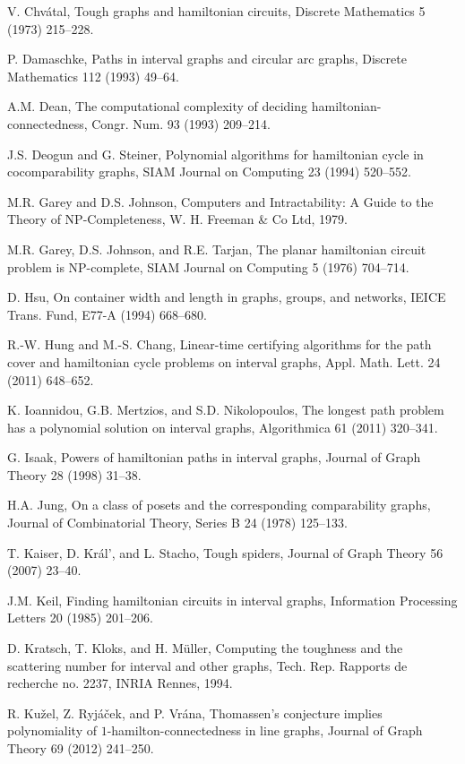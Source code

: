 \documentclass{llncs}
\begin{document}
\begin{thebibliography}{10}
V. Chv\'atal, Tough graphs and hamiltonian circuits, Discrete Mathematics 5 (1973) 215--228.

P. Damaschke, Paths in interval graphs and circular arc graphs, Discrete Mathematics 112 (1993) 49--64.

A.M. Dean, The computational complexity of deciding hamiltonian-connectedness, Congr. Num. 93 (1993) 209--214.

J.S. Deogun and G. Steiner, Polynomial algorithms for hamiltonian cycle in cocomparability graphs, SIAM Journal on Computing 23 (1994) 520--552.

M.R. Garey and D.S. Johnson, Computers and Intractability: A Guide to the Theory of NP-Completeness, W. H. Freeman \& Co Ltd, 1979.

M.R. Garey, D.S. Johnson, and R.E. Tarjan, The planar hamiltonian circuit problem is NP-complete, SIAM Journal on Computing 5 (1976) 704--714.

D. Hsu, On container width and length in graphs, groups, and networks, IEICE Trans. Fund, E77-A (1994) 668--680.

R.-W. Hung and M.-S. Chang, Linear-time certifying algorithms for the path cover and hamiltonian cycle problems on interval graphs, Appl. Math. Lett. 24 (2011) 648--652.

K. Ioannidou, G.B. Mertzios, and S.D. Nikolopoulos,
The longest path problem has a polynomial solution on interval graphs,
Algorithmica 61 (2011) 320--341.

G. Isaak, Powers of hamiltonian paths in interval graphs,
Journal of Graph Theory 28 (1998) 31--38.

H.A. Jung, On a class of posets and the corresponding comparability graphs, Journal of Combinatorial Theory, Series B 24 (1978) 125--133.
 
T. Kaiser, D. Kr\'al', and L. Stacho, Tough spiders, Journal of Graph Theory 56 (2007) 23--40.

J.M. Keil,  Finding hamiltonian circuits in interval graphs, Information Processing Letters 20 (1985) 201--206.

D. Kratsch, T. Kloks, and H. M\"uller, Computing the toughness and the scattering number for interval and other graphs, Tech. Rep. Rapports de recherche no. 2237, INRIA Rennes, 1994.

R. Ku\v{z}el, Z. Ryj{\'a}\v{c}ek, and P. Vr{\'a}na,
Thomassen's conjecture implies polynomiality of $1$-hamilton-connectedness in line graphs, Journal of Graph Theory 69 (2012) 241--250.


\end{thebibliography}
\end{document}

